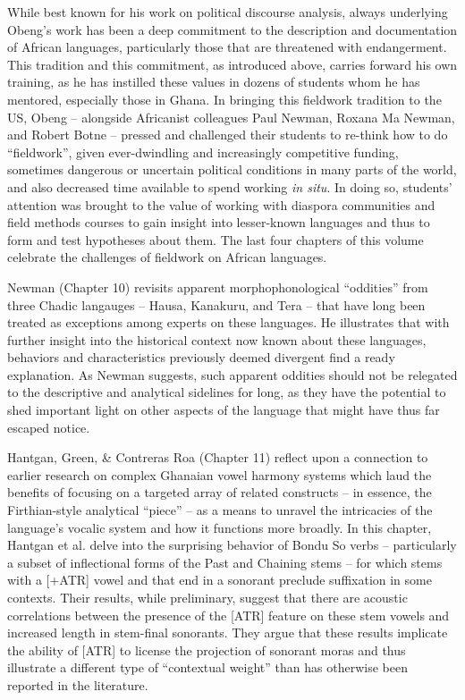 \documentclass[output=paper,colorlinks,citecolor=brown]{langscibook}
\begin{document}
While best known for his work on political discourse analysis, always underlying Obeng's work has been a deep commitment to the description and documentation of African languages, particularly those that are threatened with endangerment. This tradition and this commitment, as introduced above, carries forward his own training, as he has instilled these values in dozens of students whom he has mentored, especially those in Ghana. In bringing this fieldwork tradition to the US, Obeng -- alongside Africanist colleagues Paul Newman, Roxana Ma Newman, and Robert Botne -- pressed and challenged their students to re-think how to do ``fieldwork'', given ever-dwindling and increasingly competitive funding, sometimes dangerous or uncertain political conditions in many parts of the world, and also decreased time available to spend working \textit{in situ}. In doing so, students' attention was brought to the value of working with diaspora communities and field methods courses to gain insight into lesser-known languages and thus to form and test hypotheses about them. The last four chapters of this volume celebrate the challenges of fieldwork on African languages.

Newman (Chapter 10) revisits apparent morphophonological ``oddities'' from three Chadic langauges -- Hausa, Kanakuru, and Tera -- that have long been treated as exceptions among experts on these languages. He illustrates that with further insight into the historical context now known about these languages, behaviors and characteristics previously deemed divergent find a ready explanation. As Newman suggests, such apparent oddities should not be relegated to the descriptive and analytical sidelines for long, as they have the potential to shed important light on other aspects of the language that might have thus far escaped notice.  

Hantgan, Green, \& Contreras Roa (Chapter 11) reflect upon a connection to earlier research on complex Ghanaian vowel harmony systems which laud the benefits of focusing on a targeted array of related constructs -- in essence, the Firthian-style analytical ``piece'' -- as a means to unravel the intricacies of the language's vocalic system and how it functions more broadly. In this chapter, Hantgan et al. delve into the surprising behavior of Bondu So verbs -- particularly a subset of inflectional forms of the Past and Chaining stems -- for which stems with a [+ATR] vowel and that end in a sonorant preclude suffixation in some contexts. Their results, while preliminary, suggest that there are acoustic correlations between the presence of the [ATR] feature on these stem vowels and increased length in stem-final sonorants. They argue that these results implicate the ability of [ATR] to license the projection of sonorant moras and thus illustrate a different type of ``contextual weight'' than has otherwise been reported in the literature.
\end{document}
